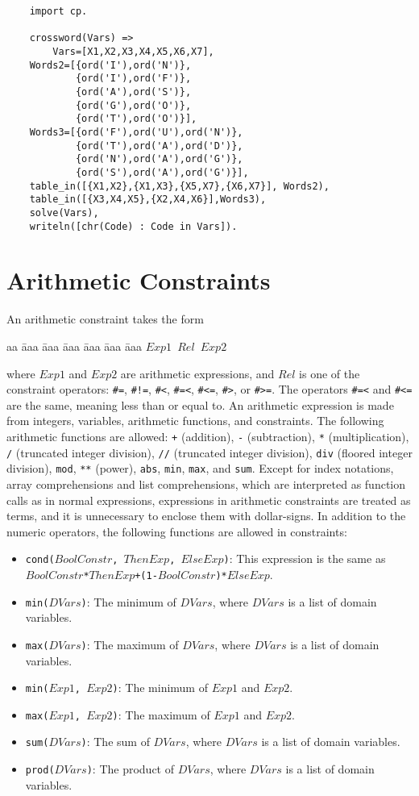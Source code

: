 \begin{verbatim}
    import cp.

    crossword(Vars) =>
        Vars=[X1,X2,X3,X4,X5,X6,X7], 
    Words2=[{ord('I'),ord('N')},
            {ord('I'),ord('F')},
            {ord('A'),ord('S')},
            {ord('G'),ord('O')},
            {ord('T'),ord('O')}],
    Words3=[{ord('F'),ord('U'),ord('N')},
            {ord('T'),ord('A'),ord('D')},
            {ord('N'),ord('A'),ord('G')},
            {ord('S'),ord('A'),ord('G')}],
    table_in([{X1,X2},{X1,X3},{X5,X7},{X6,X7}], Words2),
    table_in([{X3,X4,X5},{X2,X4,X6}],Words3),
    solve(Vars),
    writeln([chr(Code) : Code in Vars]).
\end{verbatim}

\section{Arithmetic Constraints}
An arithmetic constraint takes the form
\begin{tabbing}
aa \= aaa \= aaa \= aaa \= aaa \= aaa \= aaa \kill
\> \texttt{$Exp1$ $Rel$ $Exp2$} 
\end{tabbing}
where $Exp1$ and $Exp2$ are arithmetic expressions, and $Rel$ is one of the constraint operators:  \verb+#=+, \verb+#!=+, \verb+#<+, \verb+#=<+, \verb+#<=+, \verb+#>+, or \verb+#>=+. The operators \verb+#=<+ and \verb+#<=+ are the same, meaning less than or equal to. An arithmetic expression is made from integers, variables, arithmetic functions, and constraints. The following arithmetic functions are allowed: \texttt{+} (addition), \texttt{-} (subtraction), \texttt{*} (multiplication), \texttt{/} (truncated integer division), \texttt{//} (truncated integer division), \texttt{div} (floored integer division), \texttt{mod}, \texttt{**} (power), \texttt{abs}, \texttt{min}, \texttt{max}, and \texttt{sum}.  Except for index notations, array comprehensions and list comprehensions, which are interpreted as function calls as in normal expressions, expressions in arithmetic constraints are treated as terms, and it is unnecessary to enclose them with dollar-signs. In addition to the numeric operators, the following functions are allowed in constraints:
\begin{itemize}
\item \texttt{cond($BoolConstr$, $ThenExp$, $ElseExp$)}: This expression is the same as\\ \texttt{$BoolConstr$*$ThenExp$+(1-$BoolConstr$)*$ElseExp$}.
\item \texttt{min($DVars$)}: The minimum of $DVars$, where $DVars$ is a list of domain variables.
\item \texttt{max($DVars$)}: The maximum of $DVars$, where $DVars$ is a list of domain variables.
\item \texttt{min($Exp1$, $Exp2$)}: The minimum of $Exp1$ and $Exp2$.
\item \texttt{max($Exp1$, $Exp2$)}: The maximum of $Exp1$ and $Exp2$.
\item \texttt{sum($DVars$)}: The sum of $DVars$, where $DVars$ is a list of domain variables.
\item \texttt{prod($DVars$)}: The product of $DVars$, where $DVars$ is a list of domain variables.
\end{itemize}

